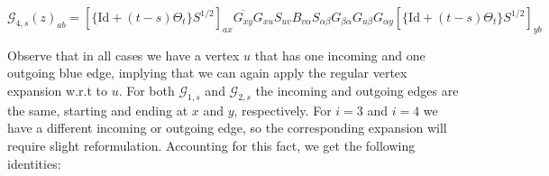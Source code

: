 \documentclass[11pt]{article}
\begin{document}
\begin{center}
\begin{equation*}
\mathcal{G}_{4, s}(z)_{ab} = \left[\{\text{Id} + (t-s)\Theta_t\}S^{1/2}\right]_{ax}\overline{G_{xy}} G_{xu}  S_{uv} B_{v\alpha}S_{\alpha\beta}G_{\beta\alpha}G_{u\beta}G_{\alpha y}\left[\{\text{Id} + (t-s)\Theta_t\}S^{1/2}\right]_{yb}
\end{equation*}
\end{center}
Observe that in all cases we have a vertex $u$ that has one incoming and one outgoing blue edge, implying that we can again apply the regular vertex expansion w.r.t to $u$. For both $\mathcal{G}_{1, s}$ and $\mathcal{G}_{2, s}$ the incoming and outgoing edges are the same, starting and ending at $x$ and $y$, respectively. For $i=3$ and $i=4$ we have a different incoming or outgoing edge, so the corresponding expansion will require slight reformulation. Accounting for this fact, we get the following identities: 
\end{document}
